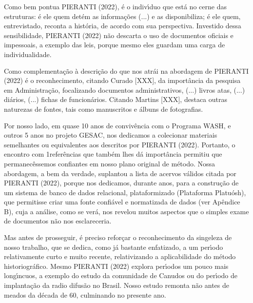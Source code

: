 \documentclass[
12pt,		%
openright,	%
twoside,  %
a4paper,			%
chapter=TITLE,		%
english,			%
french,				%
spanish,			%
brazil				%
]{USPSC-classe/USPSC}
\begin{document}
Como bem pontua  PIERANTI (2022), \textquotedbl \'e o indiv\'{\i}duo que est\'a no cerne das estruturas: \'e ele quem det\'em as informa\c{c}\~oes (...) e as disponibiliza; \'e ele quem, entrevistado, reconta a hist\'oria, de acordo com sua perspectiva\textquotedbl . Investido dessa sensibilidade,  PIERANTI (2022) n\~ao descarta o uso de documentos oficiais e impessoais, a exemplo das leis, porque mesmo eles \textquotedbl guardam uma carga de individualidade\textquotedbl .










Como complementa\c{c}\~ao \`a descri\c{c}\~ao do que nos atr\'ai na abordagem de  PIERANTI (2022) \'e o reconhecimento, citando Curado [XXX], da import\^ancia da pesquisa em Administra\c{c}\~ao, focalizando \textquotedbl documentos administrativos, (...) livros atas, (...) di\'arios, (...) fichas de funcion\'arios\textquotedbl . Citando Martins [XXX], destaca outras naturezas de fontes, tais como manuscritos e \'albuns de fotografias.










Por nosso lado, em quase 10 anos de conviv\^encia com o Programa WASH, e outros 5 anos no projeto GESAC, nos dedicamos a colecionar materiais semelhantes ou equivalentes aos descritos por PIERANTI (2022). Portanto, o encontro com 1refer\^encias que tamb\'em lhes d\'a import\^ancia permitiu que permanec\^essemos confiantes em nosso plano original de m\'etodo. Nossa abordagem, a bem da verdade, suplantou a lista de acervos v\'alidos citada por  PIERANTI (2022), porque nos dedicamos, durante anos, para a constru\c{c}\~ao de um sistema de banco de dados relacional, plataformizado (Plataforma Platu\'osh), que permitisse criar uma fonte confi\'avel e normatizada de dados (ver Ap\^endice B), cuja a an\'alise, como se ver\'a, nos revelou muitos aspectos que o simples exame de documentos n\~ao nos esclareceria.










Mas antes de prosseguir, \'e preciso refor\c{c}ar o reconhecimento da singeleza de nosso trabalho, que se dedica, como j\'a bastante enfatizado, a um per\'{\i}odo relativamente curto e muito recente, relativizando a aplicabilidade do m\'etodo historiogr\'afico. Mesmo  PIERANTI (2022) explora per\'{\i}odos um pouco mais long\'{\i}ncuos, a exemplo do estudo da comunidade de Canudos ou do per\'{\i}odo de implanta\c{c}\~ao da radio difus\~ao no Brasil. Nosso estudo remonta n\~ao antes de meados da d\'ecada de 60, culminando no presente ano.
\end{document}
